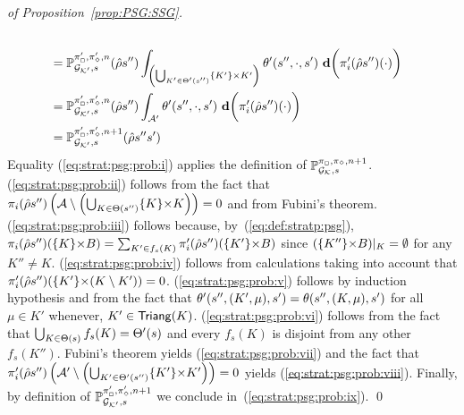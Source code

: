 \begin{proof}[of Proposition~\ref{prop:PSG:SSG}]
\begin{align}
    \label{eq:strat:psg:prob:vi}\\
    & =
    \Prob^{\strat'_{\maxplay},\strat'_{\minplay},n}_{\StochGKp,s}(\hat{\rho}s'') \int_{\left(\bigcup_{K'\in\psgtrans'(s'')}\{K'\}\times K'\right)}\sgtrans'(s'',\cdot,s')\ \diff\bigg(\strat'_{i}(\hat{\rho}s'')(\cdot)\bigg)
    \label{eq:strat:psg:prob:vii}\\
    & =
    \Prob^{\strat'_{\maxplay},\strat'_{\minplay},n}_{\StochGKp,s}(\hat{\rho}s'') \int_{\sgactions'}\sgtrans'(s'',\cdot,s')\ \diff\bigg(\strat'_{i}(\hat{\rho}s'')(\cdot)\bigg)
    \label{eq:strat:psg:prob:viii}\\
    & =
    \Prob^{\strat'_{\maxplay},\strat'_{\minplay},n+1}_{\StochGKp,s}(\hat{\rho}s''s')
    \label{eq:strat:psg:prob:ix}
  \end{align}
  Equality (\ref{eq:strat:psg:prob:i}) applies the definition of
  $\mathbb{P}^{\pi_{{\Box}},\pi_{{\Diamond}},n+1}_{{\mathcal{G}_{\mathcal{K}}},s}$.
  (\ref{eq:strat:psg:prob:ii}) follows from the fact that
  $\pi_{i}(\hat{\rho}s'')\left(\mathcal{A}\setminus\left(\bigcup_{K\in\Theta(s'')}\{K\}{\times}K\right)\right)=0$
  and from Fubini's theorem.
  (\ref{eq:strat:psg:prob:iii}) follows because,
  by~(\ref{eq:def:stratp:psg}),
  $\pi_{i}(\hat{\rho}s'')(\{K\}{\times}{B})=\sum_{K'\in f_{s}(K)} \pi'_{i}(\hat{\rho}s'')(\{K'\}{\times}{B})$
  since $(\{K''\}{\times}{B}){|_{K}}=\emptyset$ for any $K''\neq K$.
  (\ref{eq:strat:psg:prob:iv}) follows from calculations taking into
  account that
  $\pi'_{i}(\hat{\rho}s'')(\{K'\}{\times}(K\setminus K'))=0$.
  (\ref{eq:strat:psg:prob:v}) follows by induction hypothesis and from
  the fact that $\theta'(s'',(K',\mu),s')=\theta(s'',(K,\mu),s')$
  for all $\mu\in K'$ whenever, $K'\in\mathsf{Triang}(K)$.
  (\ref{eq:strat:psg:prob:vi}) follows from the fact that
  $\bigcup_{K\in\Theta(s)}f_{s}(K)=\Theta'(s)$ and every
  $f_{s}(K)$ is disjoint from any other $f_{s}(K'')$.
  Fubini's theorem yields (\ref{eq:strat:psg:prob:vii}) and the fact
  that
  $\pi'_{i}(\hat{\rho}s'')\left(\mathcal{A}'\setminus\left(\bigcup_{K'\in\Theta'(s'')}\{K'\}{\times}K'\right)\right)=0$
  yields (\ref{eq:strat:psg:prob:viii}).
  Finally, by definition of
  $\mathbb{P}^{\pi'_{{\Box}},\pi'_{{\Diamond}},n+1}_{{\mathcal{G}_{\mathcal{K}'}},s}$ we
  conclude in~(\ref{eq:strat:psg:prob:ix}).
  \qed
\end{proof}


